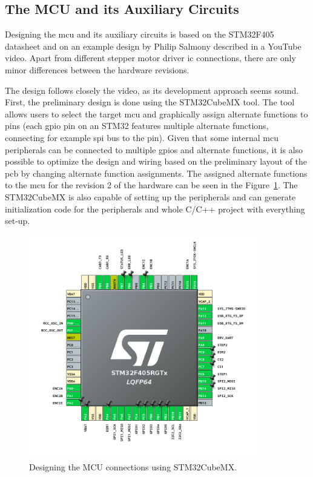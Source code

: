 \subsection{The MCU and its Auxiliary Circuits}
\label{subsec:mcu_design}
Designing the \acs{mcu} and its auxiliary circuits is based on the STM32F405 datasheet\cite{stmicro_stm32f405xx_2020} and on an example design by Philip Salmony described in a YouTube video\cite{salmony_kicad_2020}.
Apart from different stepper motor driver \acs{ic} connections, there are only minor differences between the hardware revisions.

The design follows closely the video, as its development approach seems sound.
First, the preliminary design is done using the STM32CubeMX tool.
The tool allows users to select the target \acs{mcu} and graphically assign alternate functions to pins (each \acs{gpio} pin on an STM32 features multiple alternate functions, connecting for example \acs{spi} bus to the pin).
Given that some internal \acs{mcu} peripherals can be connected to multiple \acs{gpio}s and alternate functions, it is also possible to optimize the design and wiring based on the preliminary layout of the \acs{pcb} by changing alternate function assignments.
The assigned alternate functions to the \acs{mcu} for the revision 2 of the hardware can be seen in the Figure~\ref{fig:cubemx}.
The STM32CubeMX is also capable of setting up the peripherals and can generate initialization code for the peripherals and whole C/C++ project with everything set-up.

\begin{figure}[H]
    \centering
    \includegraphics[width=0.9\textwidth]{obrazky/cube_mx}
    \caption{Designing the MCU connections using STM32CubeMX.}
    \label{fig:cubemx}
\end{figure}

